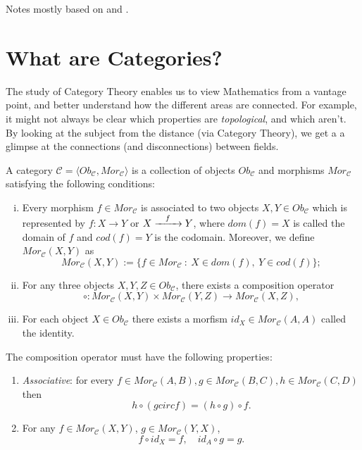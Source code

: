 Notes mostly based on \citet{maico2020categoria} and
\citet{bradley2020topology}.

\section{What are Categories?}

The study of Category Theory enables us to view Mathematics from a vantage
point, and better understand how the different areas are connected. For example,
it might not always be clear which properties are \textit{topological}, and which aren't.
By looking at the subject from the distance (via Category Theory), we get a
a glimpse at the connections (and disconnections) between fields.


\begin{definition}[Category]
	A category $\mathcal C = \langle Ob_{\mathcal C}, Mor_{\mathcal C} \rangle$ is
	a collection of objects $Ob_\mathcal C$ and morphisms
	$Mor_\mathcal C$ satisfying the following conditions:
  \begin{enumerate}[(i)]
    \item Every morphism $f \in Mor_\mathcal C$ is associated to two objects $X,Y \in Ob_{\mathcal C}$
      which is represented by $f:X \to Y$ or $X \xrightarrow{\hspace{3mm}f \hspace{3mm}} Y$,
      where $dom(f) = X$ is called the domain of $f$ and $cod(f)=Y$ is the codomain. Moreover, we define
      $Mor_\mathcal C (X,Y)$ as 
      \begin{displaymath}
        Mor_\mathcal C (X,Y) := \{f \in Mor_\mathcal C \ : \ X \in dom(f), \ Y \in cod(f)\};
      \end{displaymath}
    \item For any three objects $X,Y, Z \in Ob_\mathcal C$, there exists a composition operator
      \begin{displaymath}
        \circ: Mor_\mathcal C (X,Y)   \times Mor_\mathcal C (Y,Z) \to Mor_\mathcal C (X,Z),
      \end{displaymath}
      \item For each object $X \in Ob_\mathcal C$ there exists a morfism $id_X \in Mor_\mathcal C (A,A)$
        called the identity.
  \end{enumerate}
  The composition operator must have the following properties:
  \begin{enumerate}[(p.1)]
    \item \textit{Associative}: for every $f \in Mor_\mathcal C (A,B),
      g \in Mor_\mathcal C (B,C), h \in Mor_\mathcal C (C,D)$ then
      \begin{displaymath}
        h \circ (g circ f) = (h \circ g) \circ f.
      \end{displaymath}
    \item For any $f \in Mor_\mathcal C (X,Y)$, $g \in Mor_\mathcal C (Y,X)$, 
      \begin{displaymath}
        f \circ id_X = f,  \quad id_A \circ g = g.
      \end{displaymath}
  \end{enumerate}
\end{definition}

